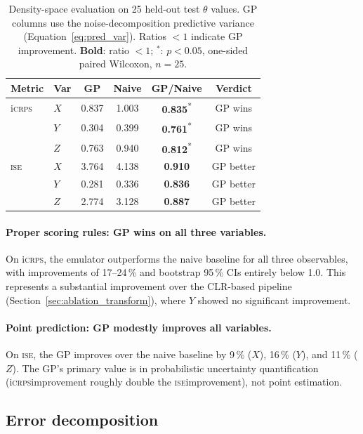 \documentclass[12pt,a4paper]{article}
\newcommand{\ISE}{\textsc{ise}}
\newcommand{\iCRPS}{i\textsc{crps}}
\newcommand{\spar}{\theta}
\begin{document}
\begin{table}[htbp]
  \centering
  \caption{Density-space evaluation on 25 held-out test $\spar$
           values.  GP columns use the noise-decomposition predictive
           variance (Equation~\ref{eq:pred_var}).  Ratios $<1$ indicate
           GP improvement.  \textbf{Bold}: ratio $<1$; $^*$: $p<0.05$,
           one-sided paired Wilcoxon, $n=25$.}
  \label{tab:density_eval}
  \begin{tabular}{llcccc}
    \toprule
    Metric & Var & GP & Naive & GP/Naive & Verdict \\
    \midrule
    \iCRPS
      & $X$ & 0.837 & 1.003 & \textbf{0.835}\textsuperscript{*} & GP wins \\
      & $Y$ & 0.304 & 0.399 & \textbf{0.761}\textsuperscript{*} & GP wins \\
      & $Z$ & 0.763 & 0.940 & \textbf{0.812}\textsuperscript{*} & GP wins \\[3pt]
    \ISE
      & $X$ & 3.764 & 4.138 & \textbf{0.910} & GP better \\
      & $Y$ & 0.281 & 0.336 & \textbf{0.836} & GP better \\
      & $Z$ & 2.774 & 3.128 & \textbf{0.887} & GP better \\
    \bottomrule
  \end{tabular}
\end{table}

\paragraph{Proper scoring rules: GP wins on all three variables.}
On \iCRPS, the emulator outperforms the naive baseline for all three
observables, with improvements of 17--24\,\% and bootstrap 95\,\% CIs
entirely below 1.0.  This represents a substantial improvement over
the CLR-based pipeline (Section~\ref{sec:ablation_transform}), where
$Y$ showed no significant improvement.

\paragraph{Point prediction: GP modestly improves all variables.}
On \ISE, the GP improves over the naive baseline by 9\,\% ($X$),
16\,\% ($Y$), and 11\,\% ($Z$).  The GP's primary value is in
probabilistic uncertainty quantification (\iCRPS improvement roughly
double the \ISE improvement), not point estimation.

\subsection{Error decomposition}
\label{sec:decomposition}
\end{document}
